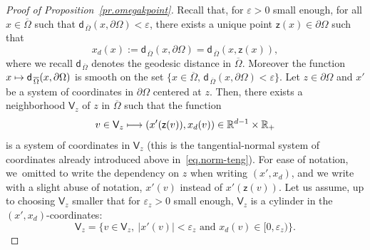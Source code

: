 \documentclass[JEP,XML,SOM,Unicode,NoEqCountersInSection,NoFloatCountersInSection,published]{cedram}
\newcommand\mto{\mathchoice{\longmapsto}{\mapsto}{\mapsto}{\mapsto}}
\let\ve\varepsilon
\theoremstyle{plain}
\theoremstyle{definition}
\begin{document}
\begin{proof}[Proof of Proposition~\ref{pr.omegakpoint}]
Recall that, for $\ve>0$ small enough, for all $x\in \overline \Omega$ such that $\mathsf d_{\, \overline \Omega}(x,\partial \Omega)<\ve$, there exists a unique
point $\mathsf z(x)\in \partial \Omega$ such that
\begin{equation}\label{eq.coordxdd}
x_d(x):=\mathsf d_{\, \overline \Omega}(x,\partial \Omega)=\mathsf d_{\, \overline \Omega}(x,\mathsf z(x)),
\end{equation}
where we recall $\mathsf d_{\, \overline \Omega}$ denotes the
geodesic distance in $\overline \Omega$. Moreover the function
$x\mto \mathsf d_{\, \overline \Omega}(x,\partial \Omega)$ is
smooth on the set $\{x\in \overline \Omega,\, \mathsf d_{\, \overline
\Omega}(x,\partial \Omega)<\ve\}$.
Let $z\in \partial \Omega$ and $x'$ be a system of coordinates in $\partial \Omega$ centered at $z$. Then, there exists a neighborhood $\mathsf V_z$ of $z$ in $\overline \Omega$ such that the function
\begin{equation}\label{eq.coord1}
v\in \mathsf V_z\mto (x'(\mathsf z(v)),x_d(v))\in \mathbb R^{d-1}\times \mathbb R_+
\end{equation}
is a system of coordinates in $\mathsf V_z$ (this is the
tangential-normal system of coordinates already introduced above in~\eqref{eq.norm-teng}). For ease of notation, we~omitted to write the dependency on $z$ when writing $(x',x_d)$, and we write with a slight abuse of notation, $x'(v)$ instead of $x'(\mathsf z(v))$.
Let us assume, up to choosing $\mathsf V_z$ smaller that for $\ve_z>0$ small enough, $\mathsf V_z$ is a cylinder in the $(x',x_d)$-coordinates:
\begin{equation}\label{eq.uz}
\mathsf V_z=\big \{v\in \mathsf V_z, \ \vert x'(v)\vert < \ve_z \text{ and } x_d(v)\in [0,\ve_z)\big \}.
\end{equation}


\end{proof}
\end{document}
